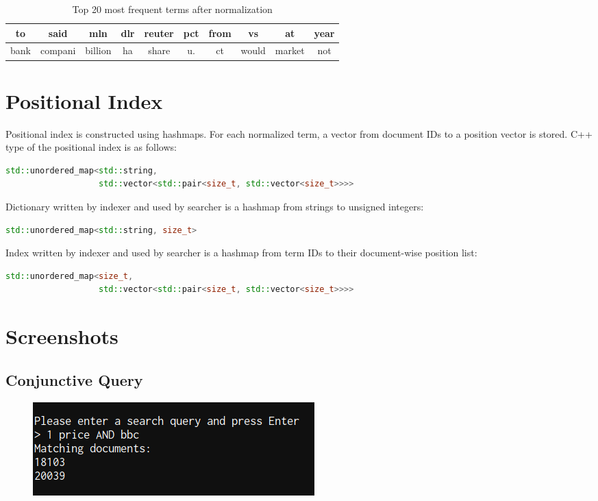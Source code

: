 \documentclass{article}
\begin{document}
\begin{table}[ht]
	\caption{Top 20 most frequent terms after normalization}
	\centering
	\begin{tabular}{|c|c|c|c|c|c|c|c|c|c|}
		\hline
		to & said & mln & dlr & reuter & pct & from & vs & at & year \\
		\hline
		bank & compani & billion & ha & share & u. & ct & would & market & not \\
		\hline
	\end{tabular}
\end{table}

\section{Positional Index}
Positional index is constructed using hashmaps. For each normalized term, a vector
from document IDs to a position vector is stored. C++ type of the positional index
is as follows:

\begin{lstlisting}[language=C++]
std::unordered_map<std::string,
                   std::vector<std::pair<size_t, std::vector<size_t>>>>
\end{lstlisting}

Dictionary written by indexer and used by searcher is a hashmap from strings
to unsigned integers:

\begin{lstlisting}[language=C++]
std::unordered_map<std::string, size_t>
\end{lstlisting}

Index written by indexer and used by searcher is a hashmap from term IDs to
their document-wise position list:

\begin{lstlisting}[language=C++]
std::unordered_map<size_t,
                   std::vector<std::pair<size_t, std::vector<size_t>>>>
\end{lstlisting}

\section{Screenshots}

\subsection{Conjunctive Query}

\begin{figure}[ht]
	\centering
	\includegraphics{conjunctive.png}
\end{figure}
\end{document}
